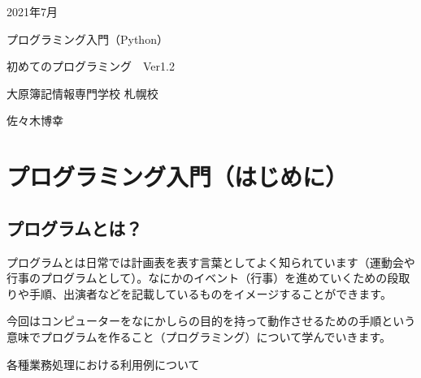 \documentclass[11pt,a4paper,dvipdfmx,titlepage]{jsreport}
\begin{document}
\begin{center}
  \huge 2021年7月　\par
  \vspace{15mm}
  \huge プログラミング入門（Python） \par
  \vspace{15mm}
  \LARGE  初めてのプログラミング　Ver1.2\par
  \vspace{100mm}
\end{center}
 
\begin{flushright}
 \Large 大原簿記情報専門学校 札幌校 \par
  \vspace{15mm}
  \Large 佐々木博幸 \par
  \vspace{10mm}
\end{flushright}
\thispagestyle{empty}
\clearpage
\addtocounter{page}{-1}
\newpage

\tableofcontents
\printindex
\chapter{プログラミング入門（はじめに）}

\section{プログラムとは？}
プログラムとは日常では計画表を表す言葉としてよく知られています（運動会や行事のプログラムとして）。なにかのイベント（行事）を進めていくための段取りや手順、出演者などを記載しているものをイメージすることができます。



今回はコンピューターをなにかしらの目的を持って動作させるための手順という意味でプログラムを作ること（プログラミング）について学んでいきます。


各種業務処理における利用例について
\end{document}
